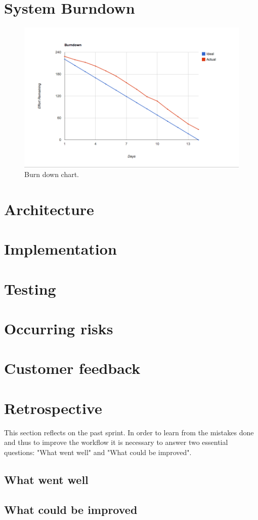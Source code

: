 \section{System Burndown}
\begin{figure}[H]
	\centering
		\includegraphics[width=18cm]{sprint4/BurndownSprint4.png}
	\caption{Burn down chart.}
	\label{fig:Burn4 }
\end{figure}
\section{Architecture}
\section{Implementation}
\section{Testing}
\section{Occurring risks}
\section{Customer feedback}
\section{Retrospective}
This section reflects on the past sprint. In order to learn from the mistakes done and thus to improve the workflow it is necessary to answer two essential questions: "What went well" and "What could be improved".

\subsection{What went well}
\subsection{What could be improved}
